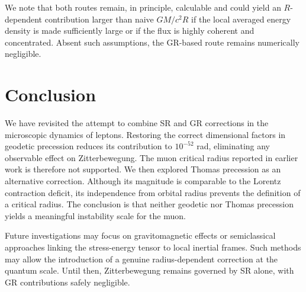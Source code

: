 \documentclass[%
 reprint,
 amsmath,amssymb,
 aps,
]{revtex4-1}
\numberwithin{equation}{section}%
\begin{document}
We note that both routes remain, in principle, calculable and could yield an $R$-dependent contribution larger than naive $GM/c^{2}R$ if the local averaged energy density is made sufficiently large or if the flux is highly coherent and concentrated. Absent such assumptions, the GR-based route remains numerically negligible.



\section{Conclusion}\label{sec:conclusion}

We have revisited the attempt to combine SR and GR corrections in the microscopic dynamics of leptons. Restoring the correct dimensional factors in geodetic precession reduces its contribution to $10^{-52}$ rad, eliminating any observable effect on Zitterbewegung. The muon critical radius reported in earlier work 
is therefore not supported. We then explored Thomas precession as an alternative correction. Although its magnitude is comparable to the Lorentz contraction deficit, its independence from orbital radius prevents the definition of a critical radius. The conclusion is that neither geodetic nor Thomas precession yields a meaningful instability scale for the muon. 

Future investigations may focus on gravitomagnetic effects or semiclassical approaches linking the stress-energy tensor to local inertial frames. Such methods may allow the introduction of a genuine radius-dependent correction at the quantum scale. Until then, Zitterbewegung remains governed by SR alone, with GR contributions safely negligible. 

\clearpage
\end{document}
